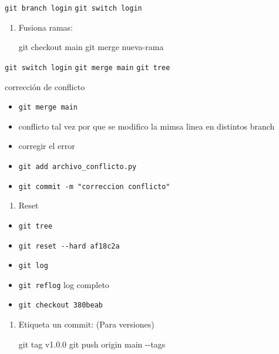 \documentclass[
  doc,
  floatsintext,
  longtable,
  a4paper,
  nolmodern,
  notxfonts,
  notimes,
  colorlinks=true,linkcolor=blue,citecolor=blue,urlcolor=blue]{apa7}
\newenvironment{Shaded}{\begin{snugshade}}{\end{snugshade}}
\newcommand{\AttributeTok}[1]{\textcolor[rgb]{0.40,0.45,0.13}{#1}}
\newcommand{\FunctionTok}[1]{\textcolor[rgb]{0.28,0.35,0.67}{#1}}
\newcommand{\NormalTok}[1]{\textcolor[rgb]{0.00,0.23,0.31}{#1}}
\providecommand{\tightlist}{%
  \setlength{\itemsep}{0pt}\setlength{\parskip}{0pt}}
\begin{document}
\texttt{git\ branch\ login} \texttt{git\ switch\ login}

\begin{enumerate}
\def\labelenumi{\arabic{enumi}.}
\setcounter{enumi}{1}
\item
  Fusiona ramas:

\begin{Shaded}
\begin{Highlighting}[]
\FunctionTok{git}\NormalTok{ checkout main}
\FunctionTok{git}\NormalTok{ merge nueva{-}rama}
\end{Highlighting}
\end{Shaded}
\end{enumerate}

\texttt{git\ switch\ login} \texttt{git\ merge\ main} \texttt{git\ tree}

corrección de conflicto

\begin{itemize}
\tightlist
\item
  \texttt{git\ merge\ main}
\item
  conflicto tal vez por que se modifico la mimsa linea en distintos
  branch
\item
  corregir el error
\item
  \texttt{git\ add\ archivo\_conflicto.py}
\item
  \texttt{git\ commit\ -m\ "correccion\ conflicto"}
\end{itemize}

\begin{enumerate}
\def\labelenumi{\arabic{enumi}.}
\setcounter{enumi}{2}
\tightlist
\item
  Reset
\end{enumerate}

\begin{itemize}
\tightlist
\item
  \texttt{git\ tree}
\item
  \texttt{git\ reset\ -\/-hard\ af18c2a}
\item
  \texttt{git\ log}
\item
  \texttt{git\ reflog} log completo
\item
  \texttt{git\ checkout\ 380beab}
\end{itemize}

\begin{enumerate}
\def\labelenumi{\arabic{enumi}.}
\setcounter{enumi}{2}
\item
  Etiqueta un commit: (Para versiones)

\begin{Shaded}
\begin{Highlighting}[]
\FunctionTok{git}\NormalTok{ tag v1.0.0}
\FunctionTok{git}\NormalTok{ push origin main }\AttributeTok{{-}{-}tags}
\end{Highlighting}
\end{Shaded}
\end{enumerate}
\end{document}
